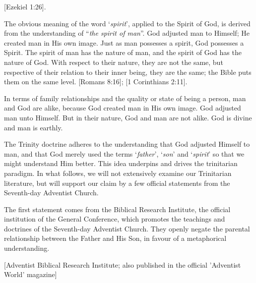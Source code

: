 [Ezekiel 1:26].

The obvious meaning of the word ‘\textit{spirit}’, applied to the Spirit of God, is derived from the understanding of “\textit{the spirit of man}”. God adjusted man to Himself; He created man in His own image. Just as man possesses a spirit, God possesses a Spirit. The spirit of man has the nature of man, and the spirit of God has the nature of God. With respect to their nature, they are not the same, but respective of their relation to their inner being, they are the same; the Bible puts them on the same level. [Romans 8:16]; [1 Corinthians 2:11].

In terms of family relationships and the quality or state of being a person, man and God are alike, because God created man in His own image. God adjusted man unto Himself. But in their nature, God and man are not alike. God is divine and man is earthly.

The Trinity doctrine adheres to the understanding that God adjusted Himself to man, and that God merely used the terms ‘\textit{father}’, ‘\textit{son}’ and ‘\textit{spirit}’ so that we might understand Him better. This idea underpins and drives the trinitarian paradigm. In what follows, we will not extensively examine our Trinitarian literature, but will support our claim by a few official statements from the Seventh-day Adventist Church. 

The first statement comes from the Biblical Research Institute, the official institution of the General Conference, which promotes the teachings and doctrines of the Seventh-day Adventist Church. They openly negate the parental relationship between the Father and His Son, in favour of a metaphorical understanding.

[Adventist Biblical Research Institute; also published in the official 'Adventist World' magazine]

